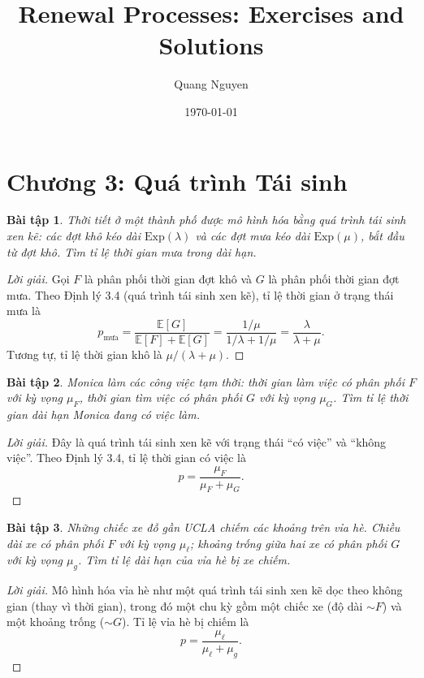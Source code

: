 \documentclass[8pt,a4paper]{article}
\title{Renewal Processes: Exercises and Solutions}
\author{Quang Nguyen}
\date{\today}
\newtheorem{exercise}{Bài tập}
\newenvironment{solution}{\begin{proof}[Lời giải]}{\end{proof}}
\newcommand{\E}{\mathbb{E}}
\begin{document}
\maketitle

\section*{Chương 3: Quá trình Tái sinh}

\begin{exercise}
Thời tiết ở một thành phố được mô hình hóa bằng quá trình tái sinh xen kẽ: các đợt khô kéo dài $\text{Exp}(\lambda)$ và các đợt mưa kéo dài $\text{Exp}(\mu)$, bắt đầu từ đợt khô. Tìm tỉ lệ thời gian mưa trong dài hạn.
\end{exercise}
\begin{solution}
Gọi $F$ là phân phối thời gian đợt khô và $G$ là phân phối thời gian đợt mưa. Theo Định lý 3.4 (quá trình tái sinh xen kẽ), tỉ lệ thời gian ở trạng thái mưa là
\[
  p_{\text{mưa}} = \frac{\E[G]}{\E[F] + \E[G]} = \frac{1/\mu}{1/\lambda + 1/\mu} = \frac{\lambda}{\lambda + \mu}.
\]
Tương tự, tỉ lệ thời gian khô là $\mu/(\lambda+\mu)$.
\end{solution}

\begin{exercise}
Monica làm các công việc tạm thời: thời gian làm việc có phân phối $F$ với kỳ vọng $\mu_F$, thời gian tìm việc có phân phối $G$ với kỳ vọng $\mu_G$. Tìm tỉ lệ thời gian dài hạn Monica đang có việc làm.
\end{exercise}
\begin{solution}
Đây là quá trình tái sinh xen kẽ với trạng thái ``có việc'' và ``không việc''. Theo Định lý 3.4, tỉ lệ thời gian có việc là
\[
  p = \frac{\mu_F}{\mu_F + \mu_G}.
\]
\end{solution}

\begin{exercise}
Những chiếc xe đỗ gần UCLA chiếm các khoảng trên vỉa hè. Chiều dài xe có phân phối $F$ với kỳ vọng $\mu_{\ell}$; khoảng trống giữa hai xe có phân phối $G$ với kỳ vọng $\mu_g$. Tìm tỉ lệ dài hạn của vỉa hè bị xe chiếm.
\end{exercise}
\begin{solution}
Mô hình hóa vỉa hè như một quá trình tái sinh xen kẽ dọc theo không gian (thay vì thời gian), trong đó một chu kỳ gồm một chiếc xe (độ dài $\sim F$) và một khoảng trống ($\sim G$). Tỉ lệ vỉa hè bị chiếm là
\[
  p = \frac{\mu_\ell}{\mu_\ell + \mu_g}.
\]
\end{solution}
\end{document}

